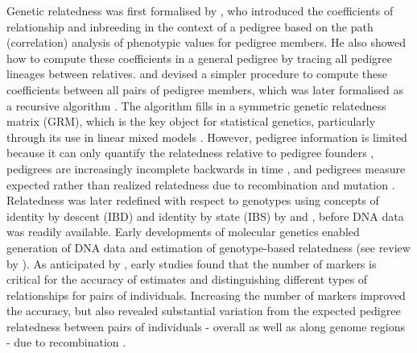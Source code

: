 \begin{tcolorbox}[breakable,pad at break*=1mm, colback=blue!5!white,colframe=blue!75!black,title=Box 1: A Brief History of Genetic Relatedness]


Genetic relatedness was first formalised by \cite{wright1922coefficients},
who introduced the coefficients of relationship and inbreeding in the
context of a pedigree based on the path (correlation) analysis of phenotypic
values for pedigree members.
%
He also showed how to compute these coefficients in a general pedigree by
tracing all pedigree lineages between relatives.
%
\cite{emik1949systematic} and \cite{cruden1949computation} devised a
simpler procedure to compute these coefficients between all pairs of
pedigree members, which was later formalised as a recursive algorithm
\citep{henderson1976simple}.
%
The algorithm fills in a symmetric genetic relatedness matrix (GRM), which is
the key object for statistical genetics, particularly through its use in
linear mixed models
\citep{falconer1996introduction, henderson1984applications,
lynch1998genetics, mrode2023linear}.
%
However, pedigree information is limited because
it can only quantify the relatedness relative to pedigree founders
\citep{wright1965interpretation, jacquard1975inbreeding},
pedigrees are increasingly incomplete backwards in time \citep[e.g.][]{legarra2015ancestral}, and
pedigrees measure expected rather than realized relatedness due to
recombination and mutation
\citep[e.g.][]{hill2011variation, thompson2013identity, garciacortes2013variance}. \\


Relatedness was later redefined with respect to genotypes using
concepts of identity by descent (IBD) and identity by state (IBS) by
\cite{cotterman1940calculus} and \cite{malecot1948mathematiques, malecot1969mathemathics},
before DNA data was readily available.
%
Early developments of molecular genetics enabled generation of DNA data
and estimation of genotype-based relatedness
(see review by \citet{weir2006genetic}).
%
As anticipated by \cite{thompson1975estimation}, early studies found that
the number of markers is critical for the accuracy of estimates
and distinguishing different types of relationships for pairs of individuals.
%
Increasing the number of markers improved the accuracy, but also
revealed substantial variation from the expected pedigree relatedness
between pairs of individuals - overall as well as along genome regions -
due to recombination \citep{weir2006genetic}. \\


\end{tcolorbox}
